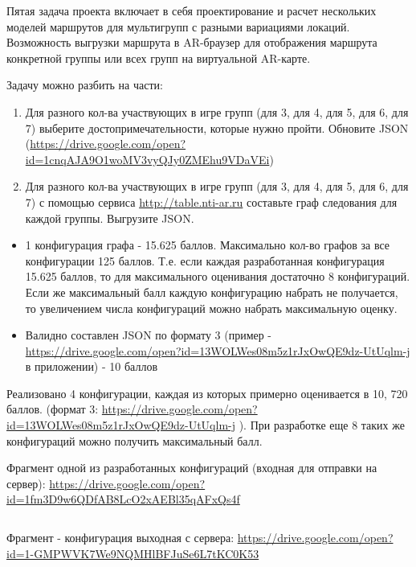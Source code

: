 
Пятая задача проекта включает в себя проектирование и расчет нескольких моделей маршрутов для мультигрупп с разными вариациями локаций. Возможность выгрузки маршрута в  AR-браузер для отображения маршрута конкретной группы или всех групп на виртуальной AR-карте.

Задачу можно разбить на части:
\begin{enumerate}
    \item Для разного кол-ва участвующих в игре групп (для 3, для 4, для 5, для 6, для 7) выберите достопримечательности, которые нужно пройти. Обновите JSON (\url{https://drive.google.com/open?id=1cnqAJA9O1woMV3vyQJy0ZMEhu9VDaVEi})
    \item Для разного кол-ва участвующих в игре групп (для 3, для 4, для 5, для 6, для 7) с помощью сервиса \url{http://table.nti-ar.ru} составьте граф следования для каждой группы. Выгрузите JSON.
\end{enumerate}

\markSection
\begin{itemize}
    \item 	1 конфигурация графа - 15.625 баллов. Максимально кол-во графов за все конфигурации 125 баллов. Т.е. если каждая разработанная конфигурация 15.625 баллов, то для максимального оценивания достаточно 8 конфигураций. Если же максимальный балл каждую конфигурацию набрать не получается, то увеличением числа конфигураций можно набрать максимальную оценку. 
    \item Валидно составлен JSON по формату 3 (пример - \url{https://drive.google.com/open?id=13WOLWes08m5z1rJxOwQE9dz-UtUqlm-j}  в приложении) - 10 баллов
\end{itemize}

\solutionSection

Реализовано 4 конфигурации, каждая из которых примерно оценивается в 10, 720 баллов. (формат 3: \url{https://drive.google.com/open?id=13WOLWes08m5z1rJxOwQE9dz-UtUqlm-j} ). При разработке еще 8 таких же конфигураций можно получить максимальный балл. 

Фрагмент одной из разработанных конфигураций (входная для отправки на сервер):
\url{https://drive.google.com/open?id=1fm3D9w6QDfAB8LcO2xAEBl35qAFxQs4f}

\inputminted[fontsize=\footnotesize, linenos]{json}{final/command_tour/ar/task_06/source_1.json}

Фрагмент - конфигурация выходная с сервера:
\url{https://drive.google.com/open?id=1-GMPWVK7We9NQMHlBFJuSe6L7tKC0K53}

